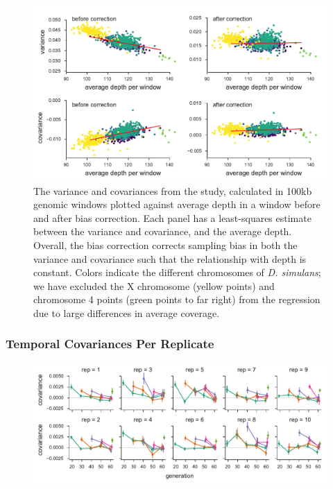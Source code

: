 \documentclass[11pt]{article}
\begin{document}
{\begin{figure}[!ht]
  \centering
  \includegraphics[]{figures/barghi-correction-plot.pdf}

  \caption{The variance and covariances from the \textcite{Barghi2019-qy}
    study, calculated in 100kb genomic windows plotted against average depth in
    a window before and after bias correction.  Each panel has a least-squares
    estimate between the variance and covariance, and the average depth.
    Overall, the bias correction corrects sampling bias in both the variance
    and covariance such that the relationship with depth is constant. Colors
    indicate the different chromosomes of \emph{D. simulans}; we have excluded
  the X chromosome (yellow points) and chromosome 4 points (green points to far
right) from the regression due to large differences in average coverage.}

  \label{suppfig:barghi-correction}
\end{figure}

\clearpage

\subsubsection{\textcite{Barghi2019-qy} Temporal Covariances Per Replicate}
\begin{figure}[!ht]
  \centering
  \includegraphics[width=\textwidth]{figures/barghi-cov-panels.pdf}


\end{figure}}
\end{document}
